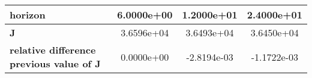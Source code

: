 \begin{tiny}\begin{tabular}{|l|c|c|c|}
\hline
\textbf{horizon}&6.0000e+00&1.2000e+01&2.4000e+01\\\hline
\textbf{J}&3.6596e+04&3.6493e+04&3.6450e+04\\\hline
\textbf{relative difference previous value of J}&0.0000e+00&-2.8194e-03&-1.1722e-03\\\hline
\end{tabular}
\end{tiny}